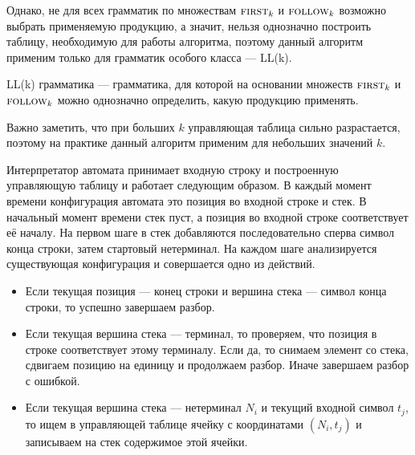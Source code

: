 Однако, не для всех грамматик по множествам $\first[k]$ и $\follow[k]$ возможно выбрать применяемую продукцию, а значит, нельзя однозначно построить таблицу, необходимую для работы алгоритма, поэтому данный алгоритм применим только для грамматик особого класса --- LL(k).

\begin{definition}
  LL(k) грамматика --- грамматика, для которой на основании множеств $\first[k]$ и $\follow[k]$ можно однозначно определить, какую продукцию применять.
\end{definition}

Важно заметить, что при больших $k$ управляющая таблица сильно разрастается, поэтому на практике данный алгоритм применим для небольших значений $k$.

Интерпретатор автомата принимает входную строку и построенную управляющую таблицу и работает следующим образом.
В каждый момент времени конфигурация автомата это позиция во входной строке и стек.
В начальный момент времени стек пуст, а позиция во входной строке соответствует её началу.
На первом шаге в стек добавляются последовательно сперва символ конца строки, затем стартовый нетерминал.
На каждом шаге анализируется существующая конфигурация и совершается одно из действий.
\begin{itemize}
\item Если текущая позиция --- конец строки и вершина стека --- символ конца строки, то успешно завершаем разбор.
\item Если текущая вершина стека --- терминал, то проверяем, что позиция в строке соответствует этому терминалу. Если да, то снимаем элемент со стека, сдвигаем позицию на единицу и продолжаем разбор. Иначе завершаем разбор с ошибкой.
\item Если текущая вершина стека --- нетерминал $N_i$ и текущий входной символ $t_j$, то ищем в управляющей таблице ячейку с координатами $(N_i, t_j)$ и записываем на стек содержимое этой ячейки.
\end{itemize}

